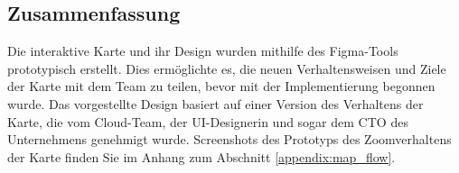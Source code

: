 \subsection{Zusammenfassung}

Die interaktive Karte und ihr Design wurden mithilfe des Figma-Tools prototypisch erstellt.
Dies ermöglichte es, die neuen Verhaltensweisen und Ziele der Karte mit dem Team zu teilen, bevor mit der Implementierung begonnen wurde.
Das vorgestellte Design basiert auf einer Version des Verhaltens der Karte, die vom Cloud-Team, der UI-Designerin und sogar dem \ac{CTO} des Unternehmens genehmigt wurde.
Screenshots des Prototyps des Zoomverhaltens der Karte finden Sie im Anhang zum Abschnitt \ref{appendix:map_flow}.
